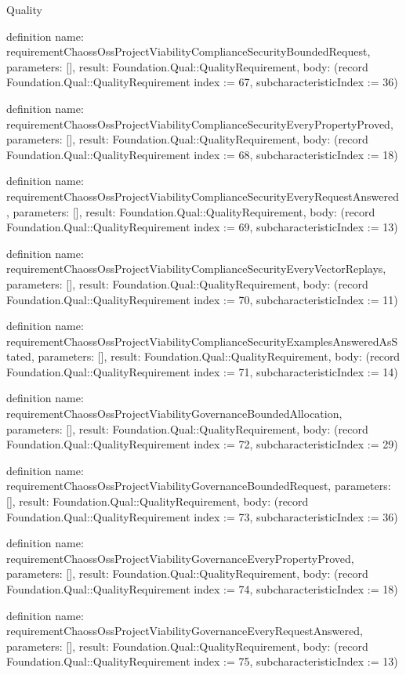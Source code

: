 \begin{lexlean}{Quality}
\begin{semanticmodule}
definition{
  name: requirementChaossOssProjectViabilityComplianceSecurityBoundedRequest,
  parameters: [],
  result: Foundation.Qual::QualityRequirement,
  body: (record Foundation.Qual::QualityRequirement {index := 67, subcharacteristicIndex := 36})
}

definition{
  name: requirementChaossOssProjectViabilityComplianceSecurityEveryPropertyProved,
  parameters: [],
  result: Foundation.Qual::QualityRequirement,
  body: (record Foundation.Qual::QualityRequirement {index := 68, subcharacteristicIndex := 18})
}

definition{
  name: requirementChaossOssProjectViabilityComplianceSecurityEveryRequestAnswered,
  parameters: [],
  result: Foundation.Qual::QualityRequirement,
  body: (record Foundation.Qual::QualityRequirement {index := 69, subcharacteristicIndex := 13})
}

definition{
  name: requirementChaossOssProjectViabilityComplianceSecurityEveryVectorReplays,
  parameters: [],
  result: Foundation.Qual::QualityRequirement,
  body: (record Foundation.Qual::QualityRequirement {index := 70, subcharacteristicIndex := 11})
}

definition{
  name: requirementChaossOssProjectViabilityComplianceSecurityExamplesAnsweredAsStated,
  parameters: [],
  result: Foundation.Qual::QualityRequirement,
  body: (record Foundation.Qual::QualityRequirement {index := 71, subcharacteristicIndex := 14})
}

definition{
  name: requirementChaossOssProjectViabilityGovernanceBoundedAllocation,
  parameters: [],
  result: Foundation.Qual::QualityRequirement,
  body: (record Foundation.Qual::QualityRequirement {index := 72, subcharacteristicIndex := 29})
}

definition{
  name: requirementChaossOssProjectViabilityGovernanceBoundedRequest,
  parameters: [],
  result: Foundation.Qual::QualityRequirement,
  body: (record Foundation.Qual::QualityRequirement {index := 73, subcharacteristicIndex := 36})
}

definition{
  name: requirementChaossOssProjectViabilityGovernanceEveryPropertyProved,
  parameters: [],
  result: Foundation.Qual::QualityRequirement,
  body: (record Foundation.Qual::QualityRequirement {index := 74, subcharacteristicIndex := 18})
}

definition{
  name: requirementChaossOssProjectViabilityGovernanceEveryRequestAnswered,
  parameters: [],
  result: Foundation.Qual::QualityRequirement,
  body: (record Foundation.Qual::QualityRequirement {index := 75, subcharacteristicIndex := 13})
}


\end{semanticmodule}
\end{lexlean}
